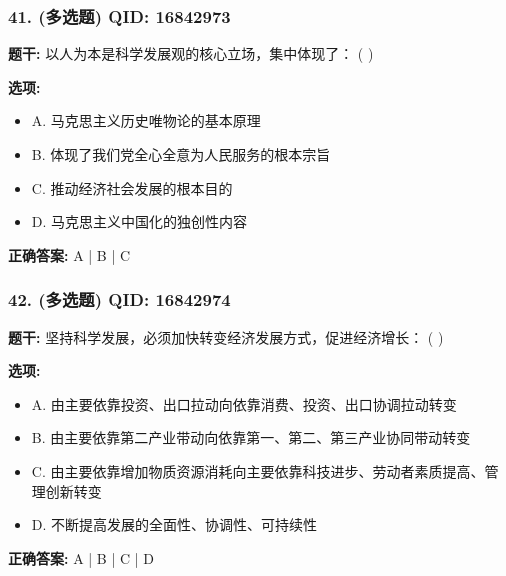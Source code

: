 \documentclass[12pt,UTF8]{ctexart}
\begin{document}
\subsubsection*{41. (多选题) \small QID: 16842973}

\textbf{题干:}
以人为本是科学发展观的核心立场，集中体现了： ( )

\textbf{选项:}
\begin{itemize}[leftmargin=*]

  \item A. 马克思主义历史唯物论的基本原理

  \item B. 体现了我们党全心全意为人民服务的根本宗旨

  \item C. 推动经济社会发展的根本目的

  \item D. 马克思主义中国化的独创性内容

\end{itemize}

\textbf{正确答案:}
A | B | C

\vspace{0.3em}\hrulefill\vspace{0.7em}

\subsubsection*{42. (多选题) \small QID: 16842974}

\textbf{题干:}
坚持科学发展，必须加快转变经济发展方式，促进经济增长： ( )

\textbf{选项:}
\begin{itemize}[leftmargin=*]

  \item A. 由主要依靠投资、出口拉动向依靠消费、投资、出口协调拉动转变

  \item B. 由主要依靠第二产业带动向依靠第一、第二、第三产业协同带动转变

  \item C. 由主要依靠增加物质资源消耗向主要依靠科技进步、劳动者素质提高、管理创新转变

  \item D. 不断提高发展的全面性、协调性、可持续性

\end{itemize}

\textbf{正确答案:}
A | B | C | D

\vspace{0.3em}\hrulefill\vspace{0.7em}
\end{document}
